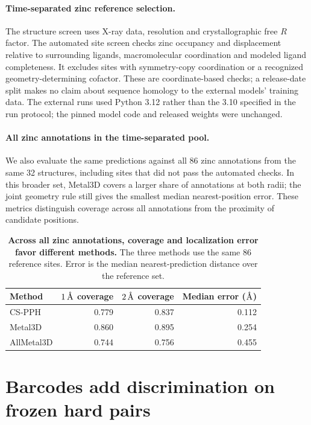 \documentclass[11pt]{article}
\newcommand{\angstrom}{\ensuremath{\text{\normalfont\AA}}}
\begin{document}
\paragraph{Time-separated zinc reference selection.}
The structure screen uses X-ray data, resolution and crystallographic free $R$ factor. The automated site screen checks zinc occupancy and displacement relative to surrounding ligands, macromolecular coordination and modeled ligand completeness. It excludes sites with symmetry-copy coordination or a recognized geometry-determining cofactor. These are coordinate-based checks; a release-date split makes no claim about sequence homology to the external models' training data. The external runs used Python 3.12 rather than the 3.10 specified in the run protocol; the pinned model code and released weights were unchanged.

\paragraph{All zinc annotations in the time-separated pool.}
We also evaluate the same predictions against all 86 zinc annotations from the same 32 structures, including sites that did not pass the automated checks. In this broader set, Metal3D covers a larger share of annotations at both radii; the joint geometry rule still gives the smallest median nearest-position error. These metrics distinguish coverage across all annotations from the proximity of candidate positions.

\begin{table}[htbp]
\centering
\caption{\textbf{Across all zinc annotations, coverage and localization error favor different methods.} The three methods use the same 86 reference sites. Error is the median nearest-prediction distance over the reference set.}
\label{tab:all-zn}
\begin{tabular}{@{}lrrr@{}}
\toprule
Method & $1\,\angstrom$ coverage & $2\,\angstrom$ coverage & Median error (\angstrom) \\
\midrule
CS-PPH & 0.779 & 0.837 & 0.112 \\
Metal3D & 0.860 & 0.895 & 0.254 \\
AllMetal3D & 0.744 & 0.756 & 0.455 \\
\bottomrule
\end{tabular}
\end{table}

\section{Barcodes add discrimination on frozen hard pairs}
\end{document}
